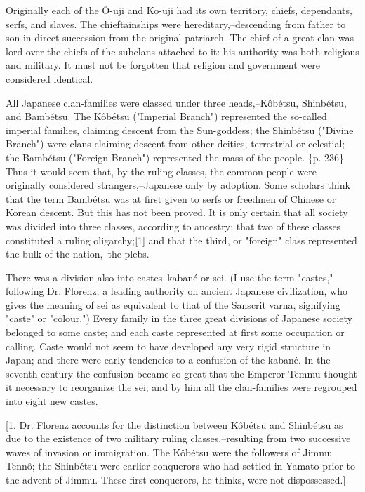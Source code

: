 Originally each of the Ô-uji and Ko-uji had its own territory, chiefs, dependants, serfs, and slaves. The chieftainships were hereditary,--descending from father to son in direct succession from the original patriarch. The chief of a great clan was lord over the chiefs of the subclans attached to it: his authority was both religious and military. It must not be forgotten that religion and government were considered identical.

All Japanese clan-families were classed under three heads,--Kôbétsu, Shinbétsu, and Bambétsu. The Kôbétsu ("Imperial Branch") represented the so-called imperial families, claiming descent from the Sun-goddess; the Shinbétsu ("Divine Branch") were clans claiming descent from other deities, terrestrial or celestial; the Bambétsu ("Foreign Branch") represented the mass of the people. \{p. 236\} Thus it would seem that, by the ruling classes, the common people were originally considered strangers,--Japanese only by adoption. Some scholars think that the term Bambétsu was at first given to serfs or freedmen of Chinese or Korean descent. But this has not been proved. It is only certain that all society was divided into three classes, according to ancestry; that two of these classes constituted a ruling oligarchy;[1] and that the third, or "foreign" class represented the bulk of the nation,--the plebs.

There was a division also into castes--kabané or sei. (I use the term "castes," following Dr. Florenz, a leading authority on ancient Japanese civilization, who gives the meaning of sei as equivalent to that of the Sanscrit varna, signifying "caste" or "colour.") Every family in the three great divisions of Japanese society belonged to some caste; and each caste represented at first some occupation or calling. Caste would not seem to have developed any very rigid structure in Japan; and there were early tendencies to a confusion of the kabané. In the seventh century the confusion became so great that the Emperor Temmu thought it necessary to reorganize the sei; and by him all the clan-families were regrouped into eight new castes.

[1. Dr. Florenz accounts for the distinction between Kôbétsu and Shinbétsu as due to the existence of two military ruling classes,--resulting from two successive waves of invasion or immigration. The Kôbétsu were the followers of Jimmu Tennô; the Shinbétsu were earlier conquerors who had settled in Yamato prior to the advent of Jimmu. These first conquerors, he thinks, were not dispossessed.]

